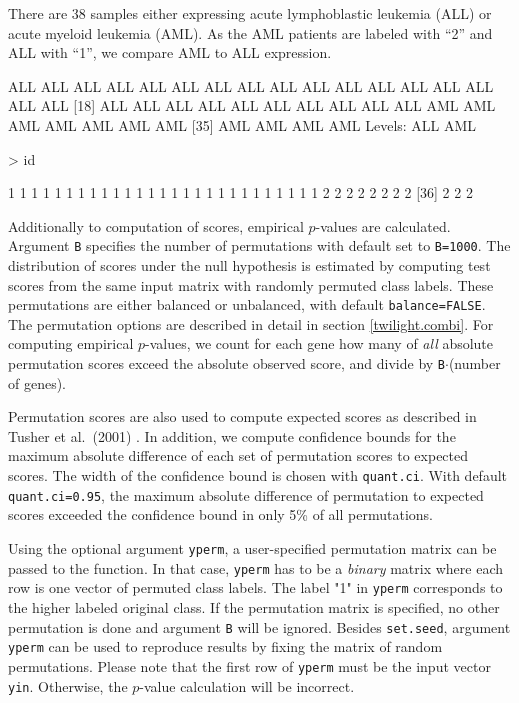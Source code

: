 \documentclass[11pt,a4paper,fleqn]{report}
\newcommand{\Rfunction}[1]{{\texttt{#1}}}
\newcommand{\Rfunarg}[1]{{\texttt{#1}}}
\begin{document}
There are 38 samples either expressing acute lymphoblastic leukemia (ALL) or acute myeloid leukemia (AML). As the AML patients are labeled with ``2'' and ALL with ``1'', we compare AML to ALL expression.
\begin{Schunk}
\begin{Soutput}
 [1] ALL ALL ALL ALL ALL ALL ALL ALL ALL ALL ALL ALL ALL ALL ALL ALL ALL
[18] ALL ALL ALL ALL ALL ALL ALL ALL ALL ALL AML AML AML AML AML AML AML
[35] AML AML AML AML
Levels: ALL AML
\end{Soutput}
\begin{Sinput}
> id
\end{Sinput}
\begin{Soutput}
 [1] 1 1 1 1 1 1 1 1 1 1 1 1 1 1 1 1 1 1 1 1 1 1 1 1 1 1 1 2 2 2 2 2 2 2 2
[36] 2 2 2
\end{Soutput}
\end{Schunk}

Additionally to computation of scores, empirical $p$-values are calculated. Argument \Rfunarg{B} specifies the number of permutations with default set to \Rfunarg{B=1000}. The distribution of scores under the null hypothesis is estimated by computing test scores from the same input matrix with randomly permuted class labels. These permutations are either balanced or unbalanced, with default \Rfunarg{balance=FALSE}. The permutation options are described in detail in section \ref{twilight.combi}. For computing empirical $p$-values, we count for each gene how many of \textit{all} absolute permutation scores exceed the absolute observed score, and divide by \Rfunarg{B}$\cdot$(number of genes).

Permutation scores are also used to compute expected scores as described in Tusher et al.~(2001) \cite{tusher01}. In addition, we compute confidence bounds for the maximum absolute difference of each set of permutation scores to expected scores. The width of the confidence bound is chosen with \Rfunarg{quant.ci}. With default \Rfunarg{quant.ci=0.95}, the maximum absolute difference of permutation to expected scores exceeded the confidence bound in only 5\% of all permutations.

Using the optional argument \Rfunarg{yperm}, a user-specified permutation matrix can be passed to the function. In that case, \Rfunarg{yperm} has to be a \textit{binary} matrix where each row is one vector of permuted class labels. The label "1" in \Rfunarg{yperm} corresponds to the higher labeled original class. If the permutation matrix is specified, no other permutation is done and argument \Rfunarg{B} will be ignored. Besides \Rfunction{set.seed}, argument \Rfunarg{yperm} can be used to reproduce results by fixing the matrix of random permutations. Please note that the first row of \Rfunarg{yperm} must be the input vector \Rfunarg{yin}. Otherwise, the $p$-value calculation will be incorrect.
\end{document}

